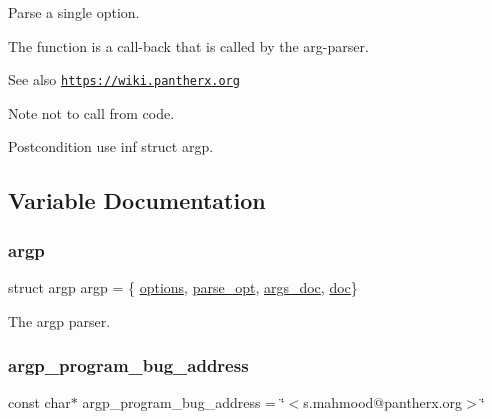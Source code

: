 Parse a single option. 

The function is a call-\/back that is called by the arg-\/parser.

\begin{DoxySeeAlso}{See also}
\href{https://wiki.pantherx.org}{\tt https\+://wiki.\+pantherx.\+org}
\end{DoxySeeAlso}
\begin{DoxyNote}{Note}
not to call from code. 
\end{DoxyNote}
\begin{DoxyPostcond}{Postcondition}
use inf struct argp. 
\end{DoxyPostcond}


\subsection{Variable Documentation}
\mbox{\label{arg-info_8h_ab70c96531b1b652d70c221cfaf3207f3}} 
\subsubsection{\texorpdfstring{argp}{argp}}
{\footnotesize\ttfamily struct argp argp = \{ \hyperlink{arg-info_8h_abc1fd3a47aea6a8944038c9100eb9135}{options}, \hyperlink{arg-info_8h_a5fb6abc38ef248ec154591e0dd392c1b}{parse\+\_\+opt}, \hyperlink{arg-info_8h_a91b08784b3668a8a1fbe2eec1947fb9d}{args\+\_\+doc}, \hyperlink{arg-info_8h_af6164deb8a824f8cb2b9147cfc3174f5}{doc}\}}



The argp parser. 

\mbox{\label{arg-info_8h_aaa037e59f26a80a8a2e35e6f2364004d}} 
\subsubsection{\texorpdfstring{argp\+\_\+program\+\_\+bug\+\_\+address}{argp\_program\_bug\_address}}
{\footnotesize\ttfamily const char$\ast$ argp\+\_\+program\+\_\+bug\+\_\+address = \char`\"{}$<$s.\+mahmood@pantherx.\+org$>$\char`\"{}}



